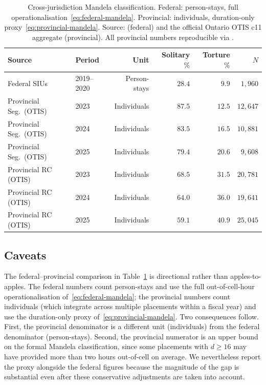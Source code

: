 \documentclass[article,shortnames,nojss]{jss}
\newcommand{\OTIS}{\textsf{OTIS}}
\begin{document}
\begin{table}[h]
\centering
\caption{Cross-jurisdiction Mandela classification. Federal:
person-stays, full operationalisation~\eqref{eq:federal-mandela}.
Provincial: individuals, duration-only proxy~\eqref{eq:provincial-mandela}.
Source: \citealt{SprottDoob2023} (federal) and the official Ontario
\OTIS{} c11 aggregate (provincial). All provincial numbers
reproducible via
.}
\label{tab:res-mandela}
\small
\begin{tabular}{llrrrr}
\toprule
Source & Period & Unit & Solitary $\%$ & Torture $\%$ & $N$ \\
\midrule
Federal SIUs               & 2019--2020 & Person-stays   & $28.4$ & $9.9$  & $1{,}960$ \\
\midrule
Provincial Seg.\ (\OTIS{}) & 2023       & Individuals    & $87.5$ & $12.5$ & $12{,}647$ \\
Provincial Seg.\ (\OTIS{}) & 2024       & Individuals    & $83.5$ & $16.5$ & $10{,}881$ \\
Provincial Seg.\ (\OTIS{}) & 2025       & Individuals    & $79.4$ & $20.6$ & $9{,}608$ \\
\midrule
Provincial RC (\OTIS{})    & 2023       & Individuals    & $68.5$ & $31.5$ & $20{,}781$ \\
Provincial RC (\OTIS{})    & 2024       & Individuals    & $64.0$ & $36.0$ & $19{,}641$ \\
Provincial RC (\OTIS{})    & 2025       & Individuals    & $59.1$ & $40.9$ & $25{,}045$ \\
\bottomrule
\end{tabular}
\end{table}

\subsection{Caveats}
\label{sec:mandela-caveats}

The federal--provincial comparison in Table~\ref{tab:res-mandela} is
directional rather than apples-to-apples. The federal numbers count
person-stays and use the full out-of-cell-hour operationalisation
of~\eqref{eq:federal-mandela}; the provincial numbers count individuals
(which integrate across multiple placements within a fiscal year)
and use the duration-only proxy of~\eqref{eq:provincial-mandela}.
Two consequences follow. First, the provincial denominator is a
different unit (individuals) from the federal denominator
(person-stays). Second, the provincial numerator is an upper bound on
the formal Mandela classification, since some placements with
$d \ge 16$ may have provided more than two hours out-of-cell on
average. We nevertheless report the proxy alongside the federal
figures because the magnitude of the gap is substantial even after
these conservative adjustments are taken into account.
\end{document}

